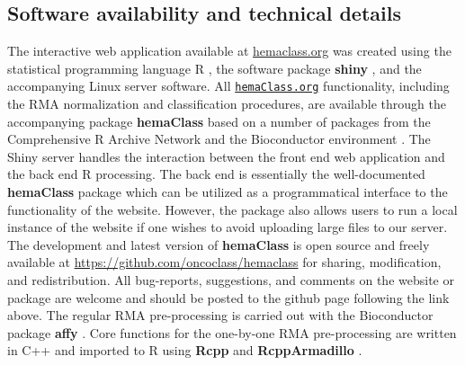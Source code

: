\documentclass[10pt,letterpaper]{article}
\newcommand{\hemaClass}{\href{http://hemaClass.org}{\texttt{hemaClass.org}}}
\newcommand{\R}{\textsf{R}}
\newcommand{\pkg}[1]{\textbf{#1}}
\begin{document}
\subsection*{Software availability and technical details}
The interactive web application available at \url{hemaclass.org} was created using the statistical programming language \R{} \cite{RCoreTeam}, the software package \pkg{shiny} \cite{shiny}, and the accompanying Linux server software.
All \hemaClass{} functionality, including the RMA normalization and classification procedures, are available through the accompanying package \pkg{hemaClass} based on a number of packages from the Comprehensive R Archive Network \cite{RCoreTeam} and the Bioconductor environment \cite{Gentleman2004}.
The Shiny server handles the interaction between the front end web application and the back end \R{} processing.
The back end is essentially the well-documented \pkg{hemaClass} package which can be utilized as a programmatical interface to the functionality of the website.
However, the package also allows users to run a local instance of the website if one wishes to avoid uploading large files to our server.
The development and latest version of \pkg{hemaClass} is open source and freely available at \url{https://github.com/oncoclass/hemaclass} for sharing, modification, and redistribution.
All bug-reports, suggestions, and comments on the website or package are welcome and should be posted to the github page following the link above.
The regular RMA pre-processing is carried out with the Bioconductor package \pkg{affy} \cite{Gautier2004}.
Core functions for the one-by-one RMA pre-processing are written in \textsf{C++} and imported to \R{} using \pkg{Rcpp} and \pkg{RcppArmadillo} \cite{Rcpp2013,Eddelbuettel2011,RcppArmadillo,Sanderson2010}.
\end{document}
